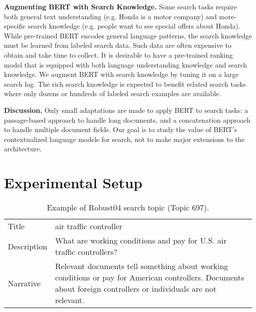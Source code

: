\documentclass[sigconf]{acmart}
\begin{document}
\textbf{Augmenting BERT with Search Knowledge.}  
Some search tasks require both general text understanding (e.g. Honda is a motor company) and more-specific search knowledge (e.g. people want to see special offers about Honda). While pre-trained BERT encodes general language patterns, the search knowledge must be learned from labeled search data.  Such data are often expensive to obtain and take time to collect. It is desirable to have a pre-trained ranking model that is equipped with both language understanding knowledge and search knowledge. We augment BERT with search knowledge by tuning it on a large search log. The rich search knowledge is expected to benefit related search tasks where only dozens or hundreds of labeled search examples are available. 





\textbf{Discussion.} 
Only small adaptations are made to apply BERT to search tasks:  
a passage-based approach to handle long documents, and a concatenation approach to handle multiple document fields.  Our goal is to study the value of BERT's contextualized language models for search, not to make major 
extensions to the architecture.
%
 \section{Experimental Setup} \label{section:exp-setup}

\begin{table}
\caption{Example of Robust04 search topic (Topic 697).}\label{tab:query-example}
\small
\vspace{-0.15in}



\begin{tabular}{p{} p{}}
\hline \hline
Title       & air traffic controller                                                                                                                                                                                                                                                  \\
Description & What are working conditions and pay for U.S. air traffic controllers?                                                                                                                                                                                             \\
Narrative   &  Relevant documents tell something about working conditions or pay for American controllers.  Documents about foreign controllers or individuals are not relevant.
\\ \hline \hline
\end{tabular}
\end{table}
\end{document}
